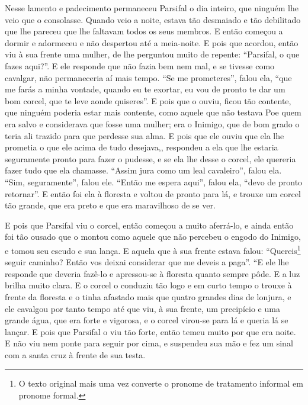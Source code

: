 Nesse lamento e padecimento permaneceu Parsifal o dia inteiro, que ninguém
lhe veio que o consolasse. Quando veio a noite, estava tão desmaiado e tão
debilitado que lhe pareceu que lhe faltavam todos os seus membros. E então
começou a dormir e adormeceu e não despertou até a meia-noite. E pois que
acordou, então viu à sua frente uma mulher, de lhe perguntou muito de repente:
“Parsifal, o que fazes aqui?”. E ele responde que não fazia bem nem mal, e se
tivesse como cavalgar, não permaneceria aí mais tempo. “Se me prometeres”,
falou ela, “que me farás a minha vontade, quando eu te exortar, eu vou de
pronto te dar um bom corcel, que te leve aonde quiseres”. E pois que o ouviu,
ficou tão contente, que ninguém poderia estar mais contente, como aquele que
não testava Poe quem era salvo e considerava que fosse uma mulher; era o
Inimigo, que de bom grado o teria ali trazido para que perdesse sua alma. E
pois que ele ouviu que ela lhe prometia o que ele acima de tudo desejava,,
respondeu a ela que lhe estaria seguramente pronto para fazer o pudesse, e se
ela lhe desse o corcel, ele quereria fazer tudo que ela chamasse. “Assim jura
como um leal cavaleiro”, falou ela. “Sim, seguramente”, falou ele. “Então me
espera aqui”, falou ela, “devo de pronto retornar”. E então foi ela à floresta
e voltou de pronto para lá, e trouxe um corcel tão grande, que era preto e que
era maravilhoso de se ver.

E pois que Parsifal viu o corcel, então começou a muito aferrá-lo, e ainda
então foi tão ousado que o montou como aquele que não percebeu o engodo do
Inimigo, e tomou seu escudo e sua lança. E aquela que à sua frente estava
falou: “Quereis\footnote{ O texto original mais uma vez converte o pronome de
tratamento informal em pronome formal.}  seguir caminho? Então vos
deixai considerar que me deveis a paga”. “E ele lhe responde que deveria
fazê-lo e apressou-se à floresta quanto sempre pôde. E a luz brilha muito
clara. E o corcel o conduziu tão logo e em curto tempo o trouxe à frente da
floresta e o tinha afastado mais que quatro grandes dias de lonjura, e ele
cavalgou por tanto tempo até que viu, à sua frente, um precipício e uma grande
água, que era forte e vigorosa, e o corcel virou-se para lá e queria lá se
lançar. E pois que Parsifal o viu tão forte, então temeu muito por que era
noite. E não viu nem ponte para seguir por cima, e suspendeu sua mão e fez um
sinal com a santa cruz à frente de sua testa.

